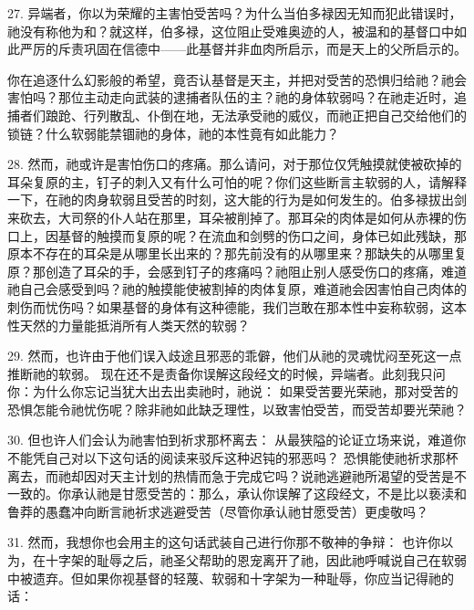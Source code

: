 27. 异端者，你以为荣耀的主害怕受苦吗？为什么当伯多禄因无知而犯此错误时，祂没有称他为和？就这样，伯多禄，这位阻止受难奥迹的人，被温和的基督口中如此严厉的斥责巩固在信德中——此基督并非血肉所启示，而是天上的父所启示的。\par

你在追逐什么幻影般的希望，竟否认基督是天主，并把对受苦的恐惧归给祂？祂会害怕吗？那位主动走向武装的逮捕者队伍的主？祂的身体软弱吗？在祂走近时，追捕者们踉跄、行列散乱、仆倒在地，无法承受祂的威仪，而祂正把自己交给他们的锁链？什么软弱能禁锢祂的身体，祂的本性竟有如此能力？\par

28. 然而，祂或许是害怕伤口的疼痛。那么请问，对于那位仅凭触摸就使被砍掉的耳朵复原的主，钉子的刺入又有什么可怕的呢？你们这些断言主软弱的人，请解释一下，在祂的肉身软弱且受苦的时刻，这大能的行为是如何发生的。伯多禄拔出剑来砍去，大司祭的仆人站在那里，耳朵被削掉了。那耳朵的肉体是如何从赤裸的伤口上，因基督的触摸而复原的呢？在流血和剑劈的伤口之间，身体已如此残缺，那原本不存在的耳朵是从哪里长出来的？那先前没有的从哪里来？那缺失的从哪里复原？那创造了耳朵的手，会感到钉子的疼痛吗？祂阻止别人感受伤口的疼痛，难道祂自己会感受到吗？祂的触摸能使被割掉的肉体复原，难道祂会因害怕自己肉体的刺伤而忧伤吗？如果基督的身体有这种德能，我们岂敢在那本性中妄称软弱，这本性天然的力量能抵消所有人类天然的软弱？\par

29. 然而，也许由于他们误入歧途且邪恶的乖僻，他们从祂的灵魂忧闷至死这一点推断祂的软弱。 现在还不是责备你误解这段经文的时候，异端者。此刻我只问你：为什么你忘记当犹大出去出卖祂时，祂说：  如果受苦要光荣祂，那对受苦的恐惧怎能令祂忧伤呢？除非祂如此缺乏理性，以致害怕受苦，而受苦却要光荣祂？\par

30. 但也许人们会认为祂害怕到祈求那杯离去：  从最狭隘的论证立场来说，难道你不能凭自己对以下这句话的阅读来驳斥这种迟钝的邪恶吗？  恐惧能使祂祈求那杯离去，而祂却因对天主计划的热情而急于完成它吗？说祂逃避祂所渴望的受苦是不一致的。你承认祂是甘愿受苦的：那么，承认你误解了这段经文，不是比以亵渎和鲁莽的愚蠢冲向断言祂祈求逃避受苦（尽管你承认祂甘愿受苦）更虔敬吗？\par

31. 然而，我想你也会用主的这句话武装自己进行你那不敬神的争辩： 也许你以为，在十字架的耻辱之后，祂圣父帮助的恩宠离开了祂，因此祂呼喊说自己在软弱中被遗弃。但如果你视基督的轻蔑、软弱和十字架为一种耻辱，你应当记得祂的话：\par

